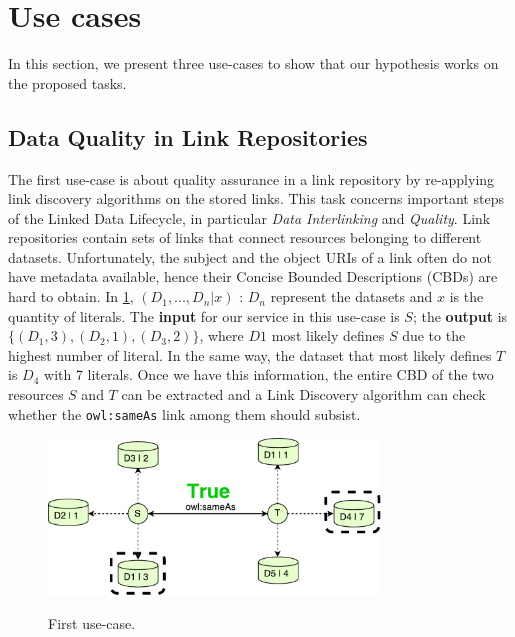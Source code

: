 \section{Use cases}

In this section, we present three use-cases to show that our hypothesis works on the proposed tasks.

\subsection{Data Quality in Link Repositories}

The first use-case is about quality assurance in a link repository by re-applying link discovery algorithms on the stored links.
This task concerns important steps of the Linked Data Lifecycle, in particular \textit{Data Interlinking} and \textit{Quality}.
Link repositories contain sets of links that connect resources belonging to different datasets. 
Unfortunately, the subject and the object URIs of a link often do not have metadata available, hence their Concise Bounded Descriptions (CBDs) are hard to obtain.
In \cref{fig:true}, $(D_1,...,D_n|x)$ : $D_n$ represent the datasets and $x$ is the quantity of literals. 
The \textbf{input} for our service in this use-case is $S$; the \textbf{output} is $\{(D_1,3),(D_2,1),(D_3,2)\}$, where $D1$ most likely defines $S$ due to the highest number of literal. 
In the same way, the dataset that most likely defines $T$ is $D_4$ with 7 literals. 
Once we have this information, the entire CBD of the two resources $S$ and $T$ can be extracted and a Link Discovery algorithm can check whether the \texttt{owl:sameAs} link among them should subsist.


\begin{figure}[htb] 
	\centering
		\includegraphics[width=250pt]{img/true.pdf}
		\label{fig:true}
		\caption{First use-case.}
\end{figure}

